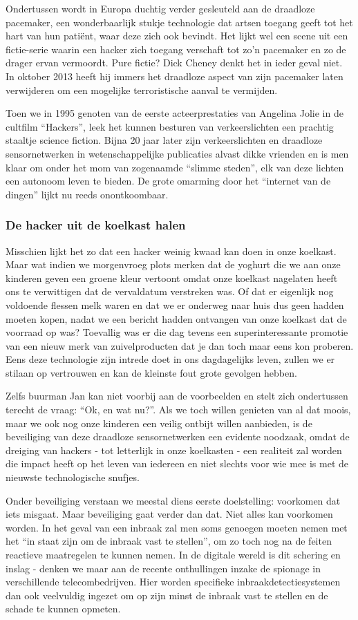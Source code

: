\documentclass[DIV=calc,paper=a4,fontsize=11pt,twocolumn]{scrartcl}
\newcommand{\heading}[1]{
\vspace{-5mm}
\subsubsection*{#1}
\vspace{-2mm}
}
\begin{document}
Ondertussen wordt in Europa duchtig verder gesleuteld aan de draadloze
pacemaker, een wonderbaarlijk stukje technologie dat artsen toegang geeft tot
het hart van hun pati\"ent, waar deze zich ook bevindt. Het lijkt wel een scene
uit een fictie-serie waarin een hacker zich toegang verschaft tot zo'n
pacemaker en zo de drager ervan vermoordt. Pure fictie? Dick Cheney denkt het
in ieder geval niet. In oktober 2013 heeft hij immers het draadloze aspect van
zijn pacemaker laten verwijderen om een mogelijke terroristische aanval te
vermijden.

Toen we in 1995 genoten van de eerste acteerprestaties van Angelina Jolie in de
cultfilm ``Hackers'', leek het kunnen besturen van verkeerslichten een prachtig
staaltje science fiction. Bijna 20 jaar later zijn verkeerslichten en draadloze
sensornetwerken in wetenschappelijke publicaties alvast dikke vrienden en is
men klaar om onder het mom van zogenaamde ``slimme steden'', elk van deze
lichten een autonoom leven te bieden. De grote omarming door het ``internet van
de dingen'' lijkt nu reeds onontkoombaar.

\heading{De hacker uit de koelkast halen}

Misschien lijkt het zo dat een hacker weinig kwaad kan doen in onze koelkast.
Maar wat indien we morgenvroeg plots merken dat de yoghurt die we aan onze
kinderen geven een groene kleur vertoont omdat onze koelkast nagelaten heeft
ons te verwittigen dat de vervaldatum verstreken was. Of dat er eigenlijk nog
voldoende flessen melk waren en dat we er onderweg naar huis dus geen hadden
moeten kopen, nadat we een bericht hadden ontvangen van onze koelkast dat de
voorraad op was? Toevallig was er die dag tevens een superinteressante promotie
van een nieuw merk van zuivelproducten dat je dan toch maar eens kon proberen.
Eens deze technologie zijn intrede doet in ons dagdagelijks leven, zullen we er
stilaan op vertrouwen en kan de kleinste fout grote gevolgen hebben.

Zelfs buurman Jan kan niet voorbij aan de voorbeelden en stelt zich ondertussen
terecht de vraag: ``Ok, en wat nu?''. Als we toch willen genieten van al dat
moois, maar we ook nog onze kinderen een veilig ontbijt willen aanbieden, is de
beveiliging van deze draadloze sensornetwerken een evidente noodzaak, omdat de
dreiging van hackers - tot letterlijk in onze koelkasten - een realiteit zal
worden die impact heeft op het leven van iedereen en niet slechts voor wie mee
is met de nieuwste technologische snufjes.

Onder beveiliging verstaan we meestal diens eerste doelstelling: voorkomen dat
iets misgaat. Maar beveiliging gaat verder dan dat. Niet alles kan voorkomen
worden. In het geval van een inbraak zal men soms genoegen moeten nemen met het
``in staat zijn om de inbraak vast te stellen'', om zo toch nog na de feiten
reactieve maatregelen te kunnen nemen. In de digitale wereld is dit schering en
inslag - denken we maar aan de recente onthullingen inzake de spionage in
verschillende telecombedrijven. Hier worden specifieke inbraakdetectiesystemen
dan ook veelvuldig ingezet om op zijn minst de inbraak vast te stellen en de
schade te kunnen opmeten.
\end{document}

